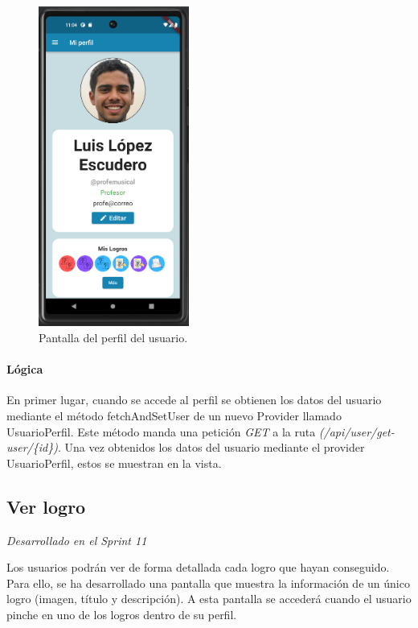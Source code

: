 \begin{figure}[H]
  \centering
  \includegraphics[width=0.44\textwidth]{imagenes/c7/miperfil.png}
  \caption{Pantalla del perfil del usuario.}
  \label{fig:login}
\end{figure}


\paragraph*{Lógica}
\label{sec:logica}
En primer lugar, cuando se accede al perfil se obtienen los datos del usuario
 mediante el método fetchAndSetUser de un nuevo Provider llamado UsuarioPerfil. Este método
manda una petición \textit{GET} a la ruta \textit{(/api/user/get-user/\{id\})}. Una vez obtenidos los datos del usuario mediante el provider UsuarioPerfil, estos se muestran en la vista. 


\subsection{Ver logro} 

\textit{Desarrollado en el Sprint 11}

Los usuarios podrán ver de forma detallada cada logro que hayan conseguido. Para ello, se ha desarrollado una pantalla que muestra la información de un único logro 
(imagen, título y descripción). A esta pantalla se accederá cuando el usuario pinche en uno de los logros dentro de su perfil.
